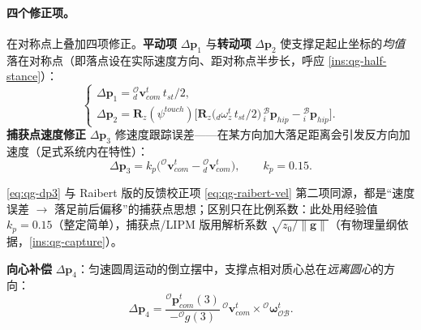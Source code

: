 \paragraph{四个修正项。}
在对称点上叠加四项修正。\textbf{平动项} $\Delta\boldsymbol{p}_1$ 与\textbf{转动项} $\Delta\boldsymbol{p}_2$ 使支撑足起止坐标的\emph{均值}落在对称点（即落点设在实际速度方向、距对称点半步长，呼应 \cref{ins:qg-half-stance}）\cite{yu2021quadruped}：
\begin{equation}
  \begin{cases}
  \Delta\boldsymbol{p}_1={}_d^{\mathcal{O}}\boldsymbol{v}_{com}^{t}\,t_{st}/2,\\
  \Delta\boldsymbol{p}_2=\mathbf{R}_z(\psi^{touch})\Big[\mathbf{R}_z\big({}_d\omega_z^{t}\,t_{st}/2\big)\,{}_i^{\mathcal{B}}\boldsymbol{p}_{hip}-{}_i^{\mathcal{B}}\boldsymbol{p}_{hip}\Big].
  \end{cases}
  \label{eq:qg-dp12}
\end{equation}
\textbf{捕获点速度修正} $\Delta\boldsymbol{p}_3$ 修速度跟踪误差——在某方向加大落足距离会引发反方向加速度（足式系统内在特性）\cite{yu2021quadruped,pratt2006capture}：
\begin{equation}
  \Delta\boldsymbol{p}_3=k_p\big({}^{\mathcal{O}}\boldsymbol{v}_{com}^{t}-{}_d^{\mathcal{O}}\boldsymbol{v}_{com}^{t}\big),
  \qquad k_p=0.15.
  \label{eq:qg-dp3}
\end{equation}

\cref{eq:qg-dp3} 与 Raibert 版的反馈校正项 \cref{eq:qg-raibert-vel} 第二项同源，都是“速度误差 $\to$ 落足前后偏移”的捕获点思想；区别只在比例系数：此处用经验值 $k_p=0.15$（整定简单），捕获点/LIPM 版用解析系数 $\sqrt{z_0/\|\boldsymbol{g}\|}$（有物理量纲依据，\cref{ins:qg-capture}）。

\textbf{向心补偿} $\Delta\boldsymbol{p}_4$：匀速圆周运动的倒立摆中，支撑点相对质心总在\emph{远离圆心}的方向\cite{yu2021quadruped}：
\begin{equation}
  \Delta\boldsymbol{p}_4=\frac{{}^{\mathcal{O}}\boldsymbol{p}_{com}^{t}(3)}{-{}^{\mathcal{O}}g(3)}\,{}^{\mathcal{O}}\boldsymbol{v}_{com}^{t}\times{}^{\mathcal{O}}\boldsymbol{\omega}_{\mathcal{OB}}^{t}.
  \label{eq:qg-dp4}
\end{equation}

